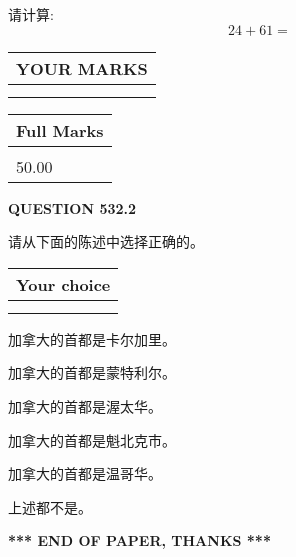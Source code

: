 \documentclass{ctexart}
\begin{document}
  
 
请计算:
\begin{equation}
24 +  %
61 = \nonumber
\end{equation}
 

 

 
  
\vspace{0.2in}
  
\noindent\begin{tabular}{|l|}
\hline
 YOUR MARKS  \\
\hline
 \\ 
 \\ 
\hline
\end{tabular}
\hspace{0.05in} \begin{tabular}{|l|}
\hline
 Full Marks  \\
\hline
 \\ 
50.00 \\
\hline
\end{tabular}
{\textbf{\Large{QUESTION
532.2 
}}}
  
  
请从下面的陈述中选择正确的。
  
  
\noindent\hspace{3.0in} \begin{tabular}{|l|}
\hline
Your choice \\
\hline
 \\ 
 \\ 
\hline
\end{tabular}
  
  
 
 
加拿大的首都是卡尔加里。
 
 
加拿大的首都是蒙特利尔。
 
 
加拿大的首都是渥太华。
 
 
加拿大的首都是魁北克市。
 
 
加拿大的首都是温哥华。
 
 
 上述都不是。
 
 
   
   
 \vspace{0.2in}
 
   
   
   
   
\vspace{1.0in} 
{\textbf{\large{ *** END OF PAPER, THANKS *** }}} 
   
\end{document}

